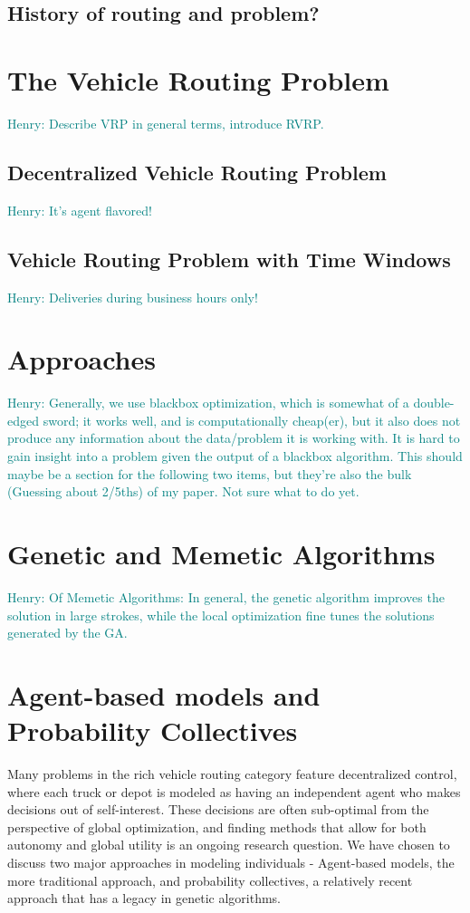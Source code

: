 \documentclass{sig-alternate}
\newcommand{\allcomments}[1]{{#1}}
\newcommand{\hfcomment}[1]{\textcolor{Teal}{\allcomments{Henry: {#1}}}}
\begin{document}
\subsection{History of routing and problem?}
\section{The Vehicle Routing Problem}
\label{sec:VRP}
\hfcomment{Describe VRP in general terms, introduce RVRP.}
\subsection{Decentralized Vehicle Routing Problem}
\hfcomment{It's agent flavored!}
\subsection{Vehicle Routing Problem with Time Windows}
\hfcomment{Deliveries during business hours only!}
	
\section{Approaches}
\hfcomment{Generally, we use blackbox optimization, which is somewhat of a double-edged sword; it works well, and is computationally cheap(er), but it also does not produce any information about the data/problem it is working with. It is hard to gain insight into a problem given the output of a blackbox algorithm. This should maybe be a section for the following two items, but they're also the bulk (Guessing about 2/5ths) of my paper. Not sure what to do yet.}

\section{Genetic and Memetic Algorithms}
\hfcomment{Of Memetic Algorithms: In general, the genetic algorithm improves the solution in large strokes, while the local optimization fine tunes the solutions generated by the GA.}

\section{Agent-based models and Probability Collectives}
\label{sec:not this section.}
Many problems in the rich vehicle routing category feature decentralized control, where each truck or depot is modeled as having an independent agent who makes decisions out of self-interest. These decisions are often sub-optimal from the perspective of global optimization, and finding methods that allow for both autonomy and global utility is an ongoing research question. We have chosen to discuss two major approaches in modeling individuals - Agent-based models, the more traditional approach, and probability collectives, a relatively recent approach that has a legacy in genetic algorithms.
\end{document}
